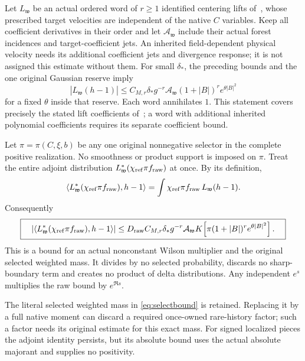 \documentclass[11pt,letterpaper]{article}
\theoremstyle{remark}\newtheorem{remark}[theorem]{Remark}
\begin{document}
Let $L_{\mathfrak w}$ be an actual ordered word of $r\ge1$ identified centering lifts of~\cite[\S6]{SZ}, whose prescribed target velocities are independent of the native $C$ variables. Keep all coefficient derivatives in their order and let $\mathcal A_{\mathfrak w}$ include their actual forest incidences and target-coefficient jets. An inherited field-dependent physical velocity needs its additional coefficient jets and divergence response; it is not assigned this estimate without them. For small $\delta_*$, the preceding bounds and the one original Gaussian reserve imply
\begin{equation}\label{eq:hword}
 |L_{\mathfrak w}(h-1)|
 \le C_{M,r}\delta_*g^{-r}\mathcal A_{\mathfrak w}
      (1+|B|)^r e^{\theta|B|^2}
\end{equation}
for a fixed $\theta$ inside that reserve. Each word annihilates $1$. This statement covers precisely the stated lift coefficients of~\cite[\S6]{SZ}; a word with additional inherited polynomial coefficients requires its separate coefficient bound.

Let $\pi=\pi(C,\xi,b)$ be any one original nonnegative selector in the complete positive realization. No smoothness or product support is imposed on $\pi$. Treat the entire adjoint distribution
$L_{\mathfrak w}^*(\chi_{\rm ref}\pi f_{\rm raw})$ at once. By its definition,
\begin{equation}\label{eq:selectoradjoint}
 \left\langle L_{\mathfrak w}^*(\chi_{\rm ref}\pi f_{\rm raw}),h-1\right\rangle
 =\int\chi_{\rm ref}\pi f_{\rm raw}\,L_{\mathfrak w}(h-1).
\end{equation}
Consequently
\begin{equation}\label{eq:selectbound}
 \boxed{\quad
 \left|\left\langle L_{\mathfrak w}^*(\chi_{\rm ref}\pi f_{\rm raw}),h-1\right\rangle\right|
 \le
 D_{\rm raw} C_{M,r}\delta_*g^{-r}\mathcal A_{\mathfrak w}
 K\!\left[\pi(1+|B|)^r e^{\theta|B|^2}\right].
 \quad}
\end{equation}
This is a bound for an actual nonconstant Wilson multiplier and the original selected weighted mass. It divides by no selected probability, discards no sharp-boundary term and creates no product of delta distributions. Any independent $e^s$ multiplies the raw bound by $e^{\Re s}$.

The literal selected weighted mass in \eqref{eq:selectbound} is retained. Replacing it by a full native moment can discard a required once-owned rare-history factor; such a factor needs its original estimate for this exact mass. For signed localized pieces the adjoint identity persists, but its absolute bound uses the actual absolute majorant and supplies no positivity.
\end{document}
